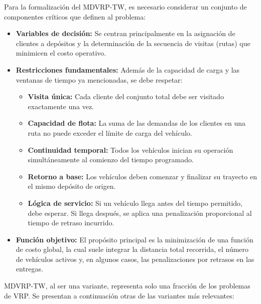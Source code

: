 \documentclass[letter, 10pt]{article}
\begin{document}
\noindent Para la formalizaci\'on del MDVRP-TW, es necesario considerar un conjunto de componentes cr\'iticos que definen al problema:

\begin{itemize}
\item \textbf{Variables de decisi\'on:} Se centran principalmente en la asignaci\'on de clientes a dep\'ositos y la determinaci\'on de la secuencia de visitas (rutas) que minimicen el costo operativo.
\item \textbf{Restricciones fundamentales:} Adem\'as de la capacidad de carga y las ventanas de tiempo ya mencionadas, se debe respetar:
\begin{itemize}
\item \textbf{Visita \'unica:} Cada cliente del conjunto total debe ser visitado exactamente una vez.
\item \textbf{Capacidad de flota:} La suma de las demandas de los clientes en una ruta no puede exceder el l\'imite de carga del veh\'iculo.
\item \textbf{Continuidad temporal:} Todos los veh\'iculos inician su operaci\'on simult\'aneamente al comienzo del tiempo programado.
\item \textbf{Retorno a base:} Los veh\'iculos deben comenzar y finalizar su trayecto en el mismo dep\'osito de origen.
\item \textbf{L\'ogica de servicio:} Si un veh\'iculo llega antes del tiempo permitido, debe esperar. Si llega despu\'es, se aplica una penalizaci\'on proporcional al tiempo de retraso incurrido.
\end{itemize}
\item \textbf{Funci\'on objetivo:} El prop\'osito principal es la minimizaci\'on de una funci\'on de costo global, la cual suele integrar la distancia total recorrida, el n\'umero de veh\'iculos activos y, en algunos casos, las penalizaciones por retrasos en las entregas.
\end{itemize}

MDVRP-TW, al ser una variante, representa solo una fracci\'on de los problemas de VRP. Se presentan a continuaci\'on otras de las variantes m\'as relevantes:
\end{document}
